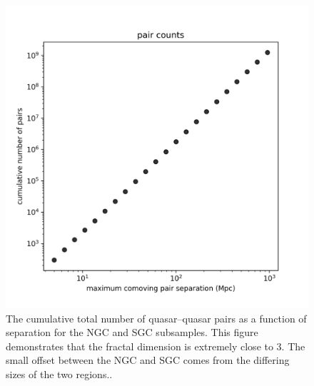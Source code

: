 \documentclass[modern]{aastex631}
\newlength{\figurewidth}
\begin{document}
\begin{figure}[t!]
  \begin{mdframed}
  \color{captiongray}
  \begin{center}
    \includegraphics[width=\figurewidth]{notebooks/cumulativeDD.png}
  \end{center}
    \caption{The cumulative total number of quasar--quasar pairs as a function of separation for the NGC and SGC subsamples.
    This figure demonstrates that the fractal dimension is extremely close to 3. The small offset between the NGC and SGC comes from the differing sizes of the two regions.\label{fig:cumulative}.}
  \end{mdframed}
\end{figure}
\end{document}
